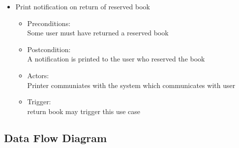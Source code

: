 \documentclass[a4paper]{article}
\begin{document}
\begin{enumerate}
\begin{itemize}
\item Print notification on return of reserved book\\ 
\begin{itemize}
\item Preconditions:\\ Some user must have returned a reserved book \\ 
 \item Postcondition:\\ A notification is printed to the user who reserved the book\\ 
 \item Actors: \\ Printer communiates with the system which communicates with user\\ 
 \item Trigger:\\ return book may trigger this use case\\ 
\end{itemize}

\end{itemize}
\end{enumerate}

\subsection{Data Flow Diagram}
\end{document}
